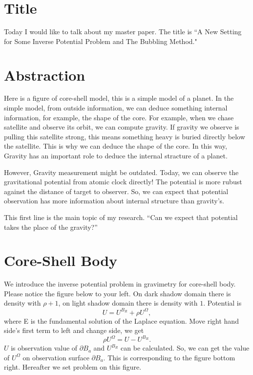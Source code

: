 \documentclass[uplatex,12pt]{jsarticle}
\begin{document}
\section{Title}

Today I would like to talk about my master paper.
The title is ``A New Setting for Some Inverse Potential Problem and The Bubbling Method."

\section{Abstraction}

Here is a figure of core-shell model, this is a simple model of a planet.
In the simple model, from outside information, we can deduce something internal information, for example, the shape of the core.
For example, when we chase satellite and observe its orbit, we can compute gravity.
If gravity we observe is pulling this satellite strong, 
this means something heavy is buried directly below the satellite.
This is why we can deduce the shape of the core.
In this way, Gravity has an important role to deduce the internal stracture of a planet.

However, Gravity measurement might be outdated.
Today, we can observe the gravitational potential from atomic clock directly!
The potential is more rubust against the distance of target to observer.
So, we can expect that potential observation has more information about internal structure than gravity's.

This first line is the main topic of my research.
``Can we expect that potential takes the place of the gravity?''

\section{Core-Shell Body}

We introduce the inverse potential problem in gravimetry for core-shell body.
Please notice the figure below to your left.
On dark shadow domain there is density with $\rho +1$,
on light shadow domain there is density with $1$.
Potential is
\[
  U = U^{B_R}+\rho U^{\Omega},
\]
where E is the fundamental solution of the Laplace equation.
Move right hand side's first term to left and change side, we get
\[
  \rho U^{\Omega} = U-U^{B_R}.
\]
$U$ is observation value of $\partial B_a$ and $U^{B_R}$ can be calculated.
So, we can get the value of $U^\Omega$ on observation surface $\partial B_a$.
This is corresponding to the figure bottom right.
Hereafter we set problem on this figure.
\end{document}
